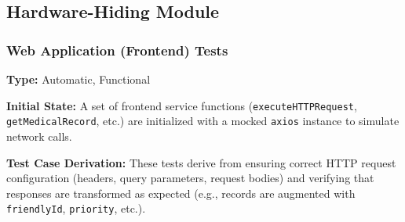 \documentclass[12pt, titlepage]{article}
\begin{document}
\subsection{Hardware-Hiding Module}

\subsubsection{Web Application (Frontend) Tests}

\textbf{Type:} Automatic, Functional
\vspace{10pt}

\noindent \textbf{Initial State:} 
 A set of frontend service functions (\texttt{executeHTTPRequest}, \texttt{getMedicalRecord}, etc.) are initialized with a mocked \texttt{axios} instance to simulate network calls.
\vspace{10pt}

\noindent \textbf{Test Case Derivation:}
These tests derive from ensuring correct HTTP request configuration (headers, query parameters, request bodies) and verifying that responses are transformed as expected (e.g., records are augmented with \texttt{friendlyId}, \texttt{priority}, etc.).
\vspace{10pt}
\end{document}
